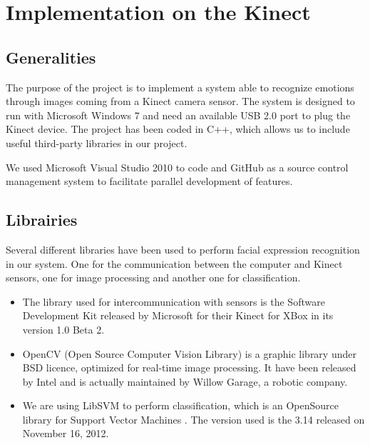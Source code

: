 \chapter{Implementation on the Kinect}
\label{chap:implementation_kinect}

\section{Generalities}

\vspace{\baselineskip}
\noindent The purpose of the project is to implement a system able to recognize emotions through images coming from a Kinect camera sensor. The system is designed to run with Microsoft Windows 7 and need an available USB 2.0 port to plug the Kinect device. The project has been coded in C++, which allows us to include useful third-party libraries in our project.
\newline 

\noindent We used Microsoft Visual Studio 2010 to code and GitHub as a source control management system to facilitate parallel development of features.
\newline

\section{Librairies}

\vspace{\baselineskip}
\noindent Several different libraries have been used to perform facial expression recognition in our system. One for the communication between the computer and Kinect sensors, one for image processing and another one for classification.

\begin{itemize}
  \item The library used for intercommunication with sensors is the Software Development Kit released by Microsoft for their Kinect for XBox in its version 1.0 Beta 2.
  \item OpenCV (Open Source Computer Vision Library) is a graphic library under BSD licence, optimized for real-time image processing. It have been released by Intel and is actually maintained by Willow Garage, a robotic company.
  \item We are using LibSVM to perform classification, which is an OpenSource library for Support Vector Machines \cite{CC01}. The version used is the 3.14 released on November 16, 2012.
\end{itemize}

